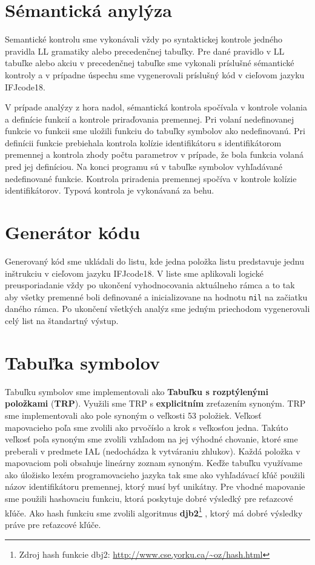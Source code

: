 \documentclass[a4paper, 11pt]{article}
\begin{document}
\section{Sémantická anylýza}
Semantické kontrolu sme vykonávali vždy po syntaktickej kontrole jedného pravidla LL gramatiky alebo precedenčnej tabuľky. Pre dané pravidlo v LL tabuľke alebo akciu v precedenčnej tabuľke sme vykonali príslušné sémantické kontroly a v prípadne úspechu sme vygenerovali príslušný kód v cieľovom jazyku IFJcode18.

V prípade analýzy z hora nadol, sémantická kontrola spočívala v kontrole volania a definície funkcií a kontrole priraďovania premennej.
Pri volaní nedefinovanej funkcie vo funkcii sme uložili funkciu do tabuľky symbolov ako nedefinovanú. Pri definícii funkcie
prebiehala kontrola kolízie identifikátoru s identifikátorom premennej a kontrola zhody počtu parametrov v prípade, že
bola funkcia volaná pred jej definíciou. Na konci programu sú v tabuľke symbolov vyhľadávané nedefinované funkcie.
Kontrola priradenia premennej spočíva v kontrole kolízie identifikátorov. Typová kontrola je vykonávaná za behu.
\section{Generátor kódu}
Generovaný kód sme ukládali do listu, kde jedna položka listu predstavuje jednu inštrukciu v cieľovom jazyku IFJcode18. V liste sme aplikovali logické preusporiadanie vždy po ukončení vyhodnocovania aktuálneho rámca a to tak aby všetky premenné boli definované a inicializovane na hodnotu \texttt{nil} na začiatku daného rámca. Po ukončení všetkých analýz sme jedným priechodom vygenerovali celý list na štandartný výstup.
\section{Tabuľka symbolov}
Tabuľku symbolov sme implementovali ako \textbf{Tabuľku s rozptýlenými položkami} (\textbf{TRP}). Využili sme TRP s \textbf{explicitním} zreťazením synoným. TRP sme implementovali ako pole synoným o veľkosti 53 položiek. Veľkosť mapovacieho poľa sme zvolili ako prvočíslo a krok s veľkosťou jedna. Takúto veľkosť poľa synoným sme zvolili vzhľadom na jej výhodné chovanie, ktoré sme preberali v predmete IAL (nedochádza k vytváraniu zhlukov). Každá položka v mapovaciom poli obsahuje lineárny zoznam synoným. Keďže tabuľku využívame ako úložisko lexém programovacieho jazyka tak sme ako vyhľadávací kľúč použili názov identifikátoru premennej, ktorý musí byť unikátny. Pre vhodné mapovanie sme použili hashovaciu funkciu, ktorá poskytuje dobré výsledký pre reťazcové kľúče. Ako hash funkciu sme zvolili algoritmus \textbf{djb2}\footnote{Zdroj hash funkcie dbj2: 
	\url{http://www.cse.yorku.ca/~oz/hash.html}}
, ktorý má dobré výsledky práve pre reťazcové kľúče.
\end{document}
